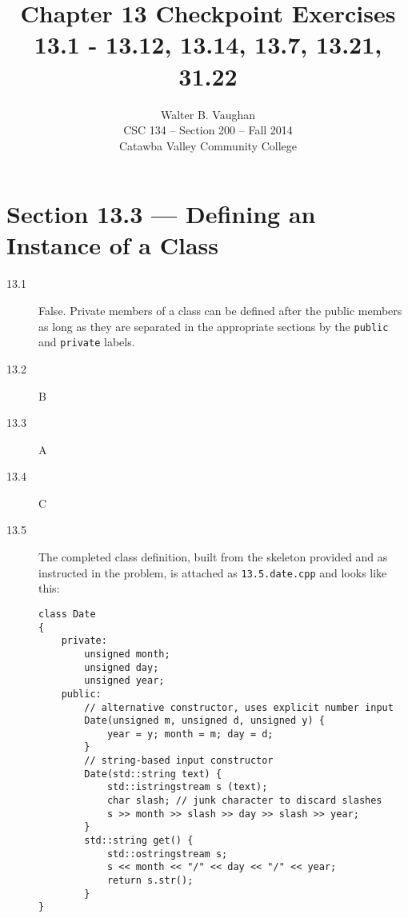 \documentclass[11pt]{article}
\author{Walter B. Vaughan\\
        \small CSC 134 -- Section 200 -- Fall 2014\\
        \small Catawba Valley Community College}
\title{Chapter 13 Checkpoint Exercises \\
       \footnotesize{13.1 - 13.12, 13.14, 13.7, 13.21, 31.22}}
\date{\vspace{-5ex}}
\begin{document}
\maketitle


\section*{Section 13.3 --- Defining an Instance of a Class}
\begin{description}

    \item[13.1] False. Private members of a class can be defined after the public members as long as they are separated in the appropriate sections by the \lstinline{public} and \lstinline{private} labels.
    \item[13.2] B
    \item[13.3] A
    \item[13.4] C
    \item[13.5] The completed class definition, built from the skeleton provided and as instructed in the problem, is attached as \texttt{13.5.date.cpp} and looks like this:
\begin{lstlisting}
class Date
{
    private:
        unsigned month;
        unsigned day;
        unsigned year;
    public:
        // alternative constructor, uses explicit number input
        Date(unsigned m, unsigned d, unsigned y) {
            year = y; month = m; day = d;
        }
        // string-based input constructor
        Date(std::string text) {
            std::istringstream s (text);
            char slash; // junk character to discard slashes
            s >> month >> slash >> day >> slash >> year;
        }
        std::string get() {
            std::ostringstream s;
            s << month << "/" << day << "/" << year;
            return s.str();
        }
}
\end{lstlisting}
\end{description}
\end{document}
